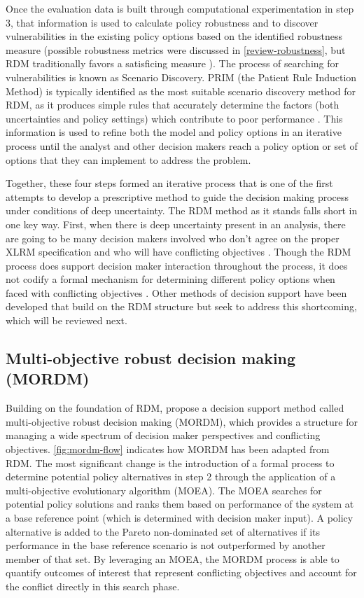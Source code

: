     Once the evaluation data is built through computational experimentation in step 3, that information is used to calculate policy robustness and to discover vulnerabilities in the existing policy options based on the identified robustness measure (possible robustness metrics were discussed in \cref{review-robustness}, but RDM traditionally favors a satisficing measure \citep{Matrosov2013b}). The process of searching for vulnerabilities is known as Scenario Discovery. PRIM (the Patient Rule Induction Method) is typically identified as the most suitable scenario discovery method for RDM, as it produces simple rules that accurately determine the factors (both uncertainties and policy settings) which contribute to poor performance \citep{Lempert2006}. This information is used to refine both the model and policy options in an iterative process until the analyst and other decision makers reach a policy option or set of options that they can implement to address the problem. 
    
    Together, these four steps formed an iterative process that is one of the first attempts to develop a prescriptive method to guide the decision making process under conditions of deep uncertainty. The RDM method as it stands falls short in one key way. First, when there is deep uncertainty present in an analysis, there are going to be many decision makers involved who don't agree on the proper XLRM specification and who will have conflicting objectives \citep{WalkerLempertKwakkel2013}. Though the RDM process does support decision maker interaction throughout the process, it does not codify a formal mechanism for determining different policy options when faced with conflicting objectives \citep{Kasprzyk2013}. Other methods of decision support have been developed that build on the RDM structure but seek to address this shortcoming, which will be reviewed next. 

    \subsection{Multi-objective robust decision making (MORDM)}\label{review-multi}
    Building on the foundation of RDM, \citet{Kasprzyk2013} propose a decision support method called multi-objective robust decision making (MORDM), which provides a structure for managing a wide spectrum of decision maker perspectives and conflicting objectives. \cref{fig:mordm-flow} indicates how MORDM has been adapted from RDM. The most significant change is the introduction of a formal process to determine potential policy alternatives in step 2 through the application of a multi-objective evolutionary algorithm (MOEA). The MOEA searches for potential policy solutions and ranks them based on performance of the system at a base reference point (which is determined with decision maker input). A policy alternative is added to the Pareto non-dominated set of alternatives if its performance in the base reference scenario is not outperformed by another member of that set. By leveraging an MOEA, the MORDM process is able to quantify outcomes of interest that represent conflicting objectives and account for the conflict directly in this search phase. 
    
